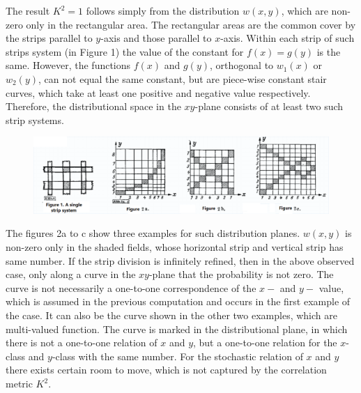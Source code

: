 \documentclass{article}
\begin{document}
The result $K^2=1$ follows simply from the distribution
$w(x,y)$, which are non-zero only in the rectangular
area. The rectangular areas are the common cover
by the strips parallel to
$y$-axis and those parallel to $x$-axis.
Within each strip of such strips system (in Figure 1)
the value of the constant for $f(x) = g(y)$ is the same.
However, the functions $f(x)$ and $g(y)$, orthogonal to
$w_1(x)$ or $w_2(y)$, can not equal
the same constant, but are piece-wise constant stair curves,
which take at least one positive and negative value respectively. Therefore, the distributional space in
the $xy$-plane consists of at least two such strip systems.
\begin{figure}[!ht]
    \centering
    \includegraphics[width=\textwidth]{a.png}
\end{figure}
The figures 2a to c show three examples for such distribution
planes. $w(x,y)$ is non-zero only in the shaded fields,
whose horizontal strip and vertical strip has same number.
If the strip division is infinitely refined, then in the above
observed case, only along 
a curve in the $xy$-plane
that the probability is not zero. The curve is not necessarily a one-to-one correspondence of the $x-$
and $y-$ value, which is assumed in the previous computation
and occurs in the first example of the case. It can also be the curve shown in the other two
examples, which are multi-valued function.
The curve is marked in the distributional plane, in which
there is not a one-to-one relation of $x$ and $y$, but a one-to-one relation for
the $x$-class and $y$-class with the same number.
For the stochastic relation of $x$ and $y$
there exists certain room to move, which is not captured
by the correlation metric $K^2$.
\end{document}
